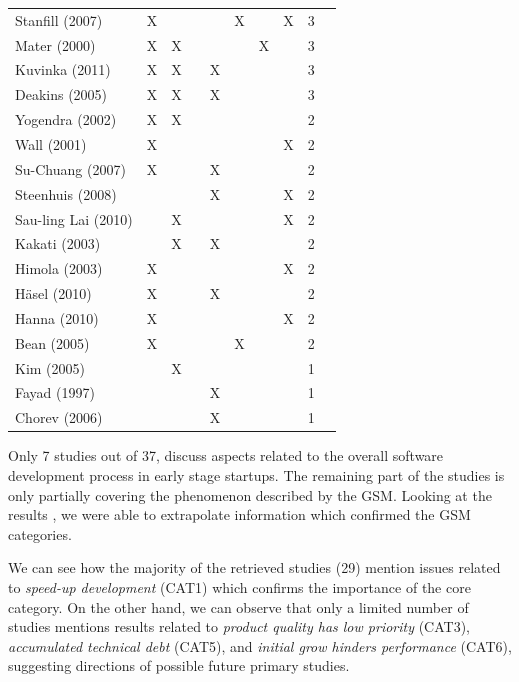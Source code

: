 \documentclass[10pt,journal,letterpaper,compsoc]{IEEEtran}
\begin{document}
\begin{table}[!t]
\begin{tabular}{|l||c||c||c||c||c||c||c||c||c|}
Stanfill (2007) & X &  &  &  & X &  & X & 3 & \cite{Stanfill2007} \\
Mater (2000) & X & X &  &  &  & X &  & 3 & \cite{Mater2000} \\
Kuvinka (2011) & X & X &  & X &  &  &  & 3 & \cite{Kuvinka2011} \\
Deakins (2005) & X & X &  & X &  &  &  & 3 & \cite{Deakins2005} \\
Yogendra (2002) & X & X &  &  &  &  &  & 2 & \cite{Yogendra2002} \\
Wall (2001) & X &  &  &  &  &  & X & 2 & \cite{Wall2001} \\
Su-Chuang (2007) & X &  &  & X &  &  &  & 2 & \cite{Su-Chan2007} \\
Steenhuis (2008) &  &  &  & X &  &  & X & 2 & \cite{Steenhuis2008} \\
Sau-ling Lai (2010) &  & X &  &  &  &  & X & 2 & \cite{Lai2010} \\
Kakati (2003) &  & X &  & X &  &  &  & 2 & \cite{Kakati2003} \\
Himola (2003) & X &  &  &  &  &  & X & 2 & \cite{Hilmola2003} \\
H\"{a}sel (2010) & X &  &  & X &  &  &  & 2 & \cite{Hasel2010} \\
Hanna (2010) & X &  &  &  &  &  & X  & 2 & \cite{Hanna2010} \\
Bean (2005) & X &  &  &  & X &  &  & 2 & \cite{Bean2005} \\
Kim (2005) &  & X &  &  &  &  &  & 1 & \cite{Kim2005} \\
Fayad (1997) &  &  &  & X &  &  &  & 1 & \cite{Fayad1997} \\
Chorev (2006) &  &  &  & X &  &  &  & 1 & \cite{Chorev2006} \\
\hline
\end{tabular}
\end{table}
 
Only 7 studies out of 37, discuss aspects related to the overall software 
development process in early stage startups. The remaining part of the studies 
is only partially covering the phenomenon described by the GSM. Looking at the 
results %
, we were able to extrapolate information which confirmed the GSM categories.

We can see how the majority of the retrieved studies (29) mention issues 
related to \textit{speed-up development} (CAT1) which confirms the importance of 
the core category. On the other hand, we can observe that only a limited number 
of studies mentions results related to \textit{product quality has low priority} 
(CAT3), \textit{accumulated technical debt} (CAT5), and \textit{initial grow 
hinders performance} (CAT6), suggesting directions of possible future primary 
studies.
\end{document}
